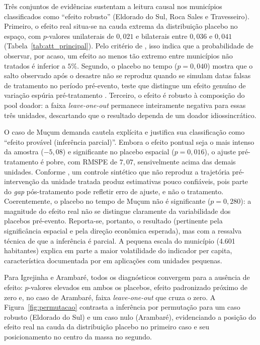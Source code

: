 \documentclass[a4paper,12pt]{article}
\begin{document}
Três conjuntos de evidências sustentam a leitura causal nos municípios
classificados como ``efeito robusto'' (Eldorado do Sul, Roca Sales e
Travesseiro). Primeiro, o efeito real situa-se na cauda extrema da
distribuição placebo no espaço, com $p$-valores unilaterais de $0{,}021$ e
bilaterais entre $0{,}036$ e $0{,}041$ (Tabela~\ref{tab:att_principal}). Pelo
critério de , isso indica que a probabilidade de
observar, por acaso, um efeito ao menos tão extremo entre municípios não
tratados é inferior a $5\%$. Segundo, o placebo no tempo ($p = 0{,}040$) mostra
que o salto observado após o desastre não se reproduz quando se simulam datas
falsas de tratamento no período pré-evento, teste que distingue um efeito
genuíno de variação espúria pré-tratamento \cite{abadie2015}. Terceiro, o
efeito é robusto à composição do pool doador: a faixa \textit{leave-one-out}
permanece inteiramente negativa para essas três unidades, descartando que o
resultado dependa de um doador idiossincrático.

O caso de Mu\c{c}um demanda cautela explícita e justifica sua classificação
como ``efeito provável (inferência parcial)''. Embora o efeito pontual seja o
mais intenso da amostra ($-5{,}08$) e significante no placebo espacial
($p = 0{,}016$), o ajuste pré-tratamento é pobre, com RMSPE de $7{,}07$,
sensivelmente acima das demais unidades. Conforme , um
controle sintético que não reproduz a trajetória pré-intervenção da unidade
tratada produz estimativas pouco confiáveis, pois parte do \textit{gap}
pós-tratamento pode refletir erro de ajuste, e não o tratamento. Coerentemente,
o placebo no tempo de Mu\c{c}um não é significante ($p = 0{,}280$): a
magnitude do efeito real não se distingue claramente da variabilidade dos
placebos pré-evento. Reporta-se, portanto, o resultado (pertinente pela
significância espacial e pela direção econômica esperada), mas com a
ressalva técnica de que a inferência é parcial. A pequena escala do município
(4{.}601 habitantes) explica em parte a maior volatilidade do indicador per
capita, característica documentada por  em aplicações
com unidades pequenas.

Para Igrejinha e Arambaré, todos os diagnósticos convergem para a ausência
de efeito: $p$-valores elevados em ambos os placebos, efeito padronizado
próximo de zero e, no caso de Arambaré, faixa \textit{leave-one-out} que
cruza o zero. A Figura~\ref{fig:permutacao} contrasta a inferência por
permutação para um caso robusto (Eldorado do Sul) e um caso nulo (Arambaré),
evidenciando a posição do efeito real na cauda da distribuição placebo no
primeiro caso e seu posicionamento no centro da massa no segundo.
\end{document}
